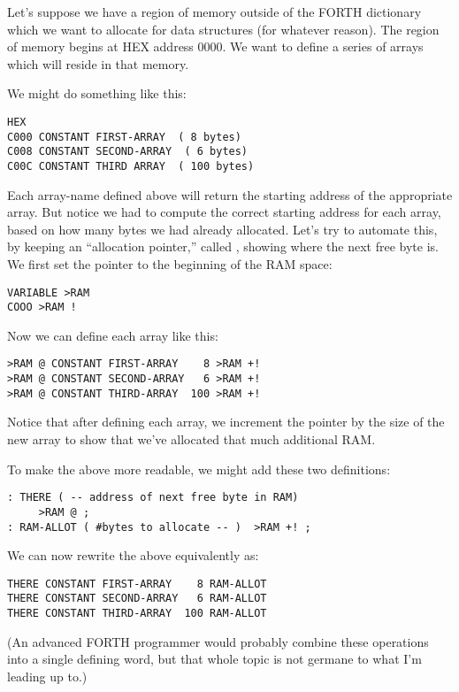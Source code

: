 Let's suppose we have a region of memory outside of the FORTH
dictionary which we want to allocate for data structures (for whatever
reason). The region of memory begins at HEX address 0000. We want to
define a series of arrays which will reside in that memory.

 We might do something like this:

\begin{verbatim}
HEX
C000 CONSTANT FIRST-ARRAY  ( 8 bytes)
C008 CONSTANT SECOND-ARRAY  ( 6 bytes)
C00C CONSTANT THIRD ARRAY  ( 100 bytes)
\end{verbatim}

Each array-name defined above will return the starting address of the
appropriate array. But notice we had to compute the correct starting
address for each array, based on how many bytes we had already
allocated. Let's try to automate this, by keeping an ``allocation
pointer,'' called , showing where the next free byte is. We first
set the pointer to the beginning of the RAM space:

\begin{verbatim}
VARIABLE >RAM
COOO >RAM !
\end{verbatim}

Now we can define each array like this:

\begin{verbatim}
>RAM @ CONSTANT FIRST-ARRAY    8 >RAM +!
>RAM @ CONSTANT SECOND-ARRAY   6 >RAM +!
>RAM @ CONSTANT THIRD-ARRAY  100 >RAM +!
\end{verbatim}

Notice that after defining each array, we increment the pointer by the
size of the new array to show that we've allocated that much additional
RAM.

To make the above more readable, we might add these two
definitions:

\begin{verbatim}
: THERE ( -- address of next free byte in RAM)
     >RAM @ ;
: RAM-ALLOT ( #bytes to allocate -- )  >RAM +! ;
\end{verbatim}

We can now rewrite the above equivalently as:

\begin{verbatim}
THERE CONSTANT FIRST-ARRAY    8 RAM-ALLOT
THERE CONSTANT SECOND-ARRAY   6 RAM-ALLOT
THERE CONSTANT THIRD-ARRAY  100 RAM-ALLOT
\end{verbatim}

(An advanced FORTH programmer would probably combine these operations
into a single defining word, but that whole topic is not germane to
what I'm leading up to.)

